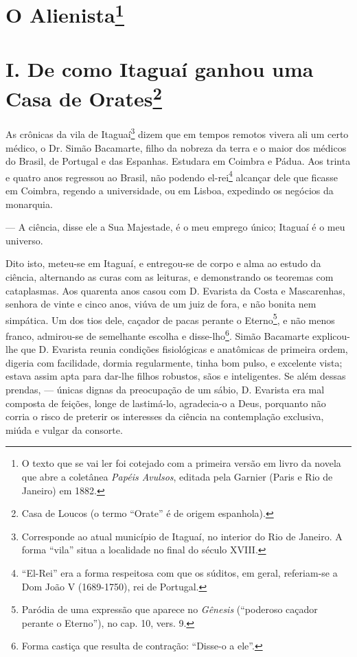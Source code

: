 \chapter{O Alienista\footnote[*]{O texto que se vai ler foi cotejado com a
  primeira versão em livro da novela que abre a coletânea \emph{Papéis
  Avulsos}, editada pela Garnier (Paris e Rio de Janeiro) em 1882.}}

\chapter{I. De como Itaguaí ganhou uma Casa de Orates\footnote{Casa de
  Loucos (o termo ``Orate'' é de origem espanhola).}}

As crônicas da vila de Itaguaí\footnote{Corresponde ao atual município
  de Itaguaí, no interior do Rio de Janeiro. A forma ``vila'' situa a
  localidade no final do século XVIII.} dizem que em tempos remotos
vivera ali um certo médico, o Dr. Simão Bacamarte, filho da nobreza da
terra e o maior dos médicos do Brasil, de Portugal e das Espanhas.
Estudara em Coimbra e Pádua. Aos trinta e quatro anos regressou ao
Brasil, não podendo el-rei\footnote{``El-Rei'' era a forma respeitosa
  com que os súditos, em geral, referiam-se a Dom João V (1689-1750),
  rei de Portugal.} alcançar dele que ficasse em Coimbra, regendo a
universidade, ou em Lisboa, expedindo os negócios da monarquia.

--- A ciência, disse ele a Sua Majestade, é o meu emprego único; Itaguaí
é o meu universo.

Dito isto, meteu-se em Itaguaí, e entregou-se de corpo e alma ao estudo
da ciência, alternando as curas com as leituras, e demonstrando os
teoremas com cataplasmas. Aos quarenta anos casou com D. Evarista da
Costa e Mascarenhas, senhora de vinte e cinco anos, viúva de um juiz de
fora, e não bonita nem simpática. Um dos tios dele, caçador de pacas
perante o Eterno\footnote{Paródia de uma expressão que aparece no
  \emph{Gênesis} (``poderoso caçador perante o Eterno''), no cap. 10,
  vers. 9.}, e não menos franco, admirou-se de semelhante escolha e
disse-lho\footnote{Forma castiça que resulta de contração: ``Disse-o a
  ele''.}. Simão Bacamarte explicou-lhe que D. Evarista reunia condições
fisiológicas e anatômicas de primeira ordem, digeria com facilidade,
dormia regularmente, tinha bom pulso, e excelente vista; estava assim
apta para dar-lhe filhos robustos, sãos e inteligentes. Se além dessas
prendas, --- únicas dignas da preocupação de um sábio, D. Evarista era
mal composta de feições, longe de lastimá-lo, agradecia-o a Deus,
porquanto não corria o risco de preterir os interesses da ciência na
contemplação exclusiva, miúda e vulgar da consorte.

